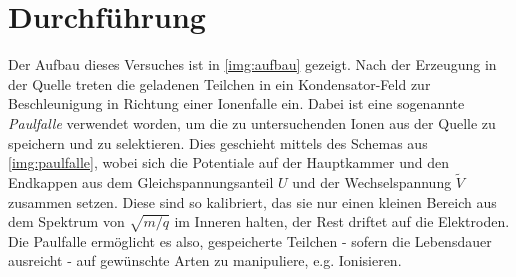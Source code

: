 \documentclass[numbers=noenddot,a4paper,notitlepage,twoside,BCOR15mm]{scrartcl}
\newcommand{\tilt}[1]{\textit{#1}}
\begin{document}
	\clearpage
	\section{Durchführung}

		Der Aufbau dieses Versuches ist in \autoref{img:aufbau} gezeigt. Nach der Erzeugung in der Quelle treten die geladenen Teilchen in ein Kondensator-Feld zur Beschleunigung in Richtung einer Ionenfalle ein. Dabei ist eine sogenannte \tilt{Paulfalle} verwendet worden, um die zu untersuchenden Ionen aus der Quelle zu speichern und zu selektieren. Dies geschieht mittels des Schemas aus \autoref{img:paulfalle}, wobei sich die Potentiale auf der Hauptkammer und den Endkappen aus dem Gleichspannungsanteil $U$ und der Wechselspannung $\tilde{V}$ zusammen setzen. Diese sind so kalibriert, das sie nur einen kleinen Bereich aus dem Spektrum von $\sqrt{m/q}$ im Inneren halten, der Rest driftet auf die Elektroden. Die Paulfalle ermöglicht es also, gespeicherte Teilchen - sofern die Lebensdauer ausreicht - auf gewünschte Arten zu manipuliere, e.g. Ionisieren.
\end{document}
